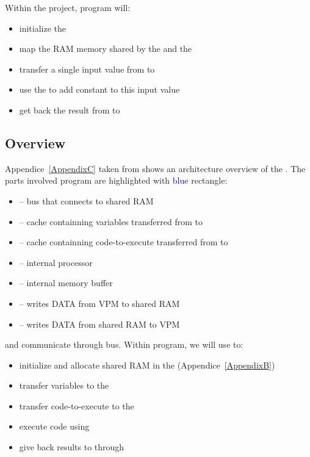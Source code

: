 Within the  project,  program will:

\begin{itemize}
	\item initialize the \vc
	\item map the RAM memory shared by the \vc{} and the \cpu
	\item transfer a single input value from \cpu{} to \vc
	\item use the \vc{} to add constant to this input value
	\item get back the result from \vc{} to \cpu
\end{itemize}



\subsection{\vc{} Overview}

Appendice~\ref{AppendixC} taken from \parencite{refVC} shows an architecture overview of the \vc. The  parts involved  program are highlighted with \textcolor{blue}{blue} rectangle:



\begin{itemize}
	\item {} -- bus that connects \vc{} to shared RAM
	\item {} -- cache containning variables transferred from \cpu{} to \vc
	\item {} -- cache containning code-to-execute transferred from \cpu{} to \vc
	\item {} -- \vc{} internal processor
	\item {} -- \vc{} internal memory buffer
	\item {} -- writes DATA from VPM to shared RAM
	\item {} -- writes DATA from shared RAM to VPM
\end{itemize}
\vspace{5 mm}

\cpu{} and \vc{} communicate through  bus. Within  program, we will use \cpu{} to:
\begin{itemize}
	\item initialize and allocate shared RAM in the  (Appendice~\ref{AppendixB})
	\item transfer variables to the 
	\item transfer code-to-execute to the 
	\item execute code using 
	\item give back results to \cpu{} through 
\end{itemize}


